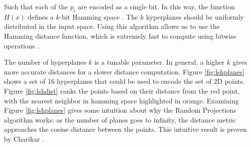 Such that each of the $p_i$ are encoded as a single bit. In this way, the function $H(x)$ defines a $k$-bit Hamming space \cite{hamming1950error}. The $k$ hyperplanes should be uniformly distributed in the input space. Using this algorithm allows us to use the Hamming distance function, which is extremely fast to compute using bitwise operations \cite{cohen1997covering}.


The number of hyperplanes $k$ is a tunable parameter. In general, a higher $k$ gives more accurate distances for a slower distance computation. Figure \ref{fig:lshplanes} shows a set of 16 hyperplanes that could be used to encode the set of 2D points. Figure \ref{fig:lshdist} ranks the points based on their distance from the red point, with the nearest neighbor in hamming space highlighted in orange. Examining Figure \ref{fig:lshplanes} gives some intuition about why the Random Projections algorithm works: as the number of planes goes to infinity, the distance metric approaches the cosine distance between the points. This intuitive result is proven by Charikar \cite{charikar2002similarity}.

